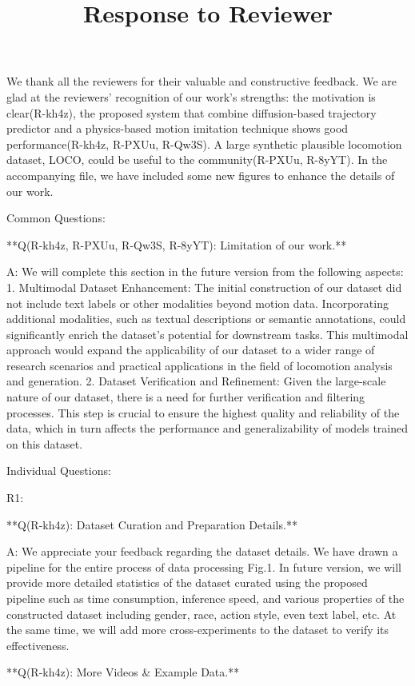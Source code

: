 \documentclass{article}
\title{Response to Reviewer}
\begin{document}
\begin{markdown}


We thank all the reviewers for their valuable and constructive feedback. We are glad at the reviewers’ recognition of our work's strengths: the motivation is clear(R-kh4z), the proposed system that combine diffusion-based trajectory predictor and a physics-based motion imitation technique shows good performance(R-kh4z, R-PXUu, R-Qw3S). A large synthetic plausible locomotion dataset, LOCO, could be useful to the community(R-PXUu, R-8yYT).
In the accompanying file, we have included some new figures to enhance the details of our work.

Common Questions:

**Q(R-kh4z, R-PXUu, R-Qw3S, R-8yYT): Limitation of our work.**

A: We will complete this section in the future version from the following aspects: 
1. Multimodal Dataset Enhancement: The initial construction of our dataset did not include text labels or other modalities beyond motion data. Incorporating additional modalities, such as textual descriptions or semantic annotations, could significantly enrich the dataset's potential for downstream tasks. This multimodal approach would expand the applicability of our dataset to a wider range of research scenarios and practical applications in the field of locomotion analysis and generation. 
2. Dataset Verification and Refinement: Given the large-scale nature of our dataset, there is a need for further verification and filtering processes. This step is crucial to ensure the highest quality and reliability of the data, which in turn affects the performance and generalizability of models trained on this dataset.

Individual Questions:

R1:

**Q(R-kh4z): Dataset Curation and Preparation Details.**

A: We appreciate your feedback regarding the dataset details. We have drawn a pipeline for the entire process of data processing Fig.1. In future version, we will provide 
more detailed statistics of the dataset curated using the proposed pipeline
such as time consumption, inference speed, and various properties of the constructed dataset including gender, race, action style, even text label, etc. At the same time, we will add more cross-experiments to the dataset to verify its effectiveness.



**Q(R-kh4z): More Videos \& Example Data.**


\end{markdown}
\end{document}
